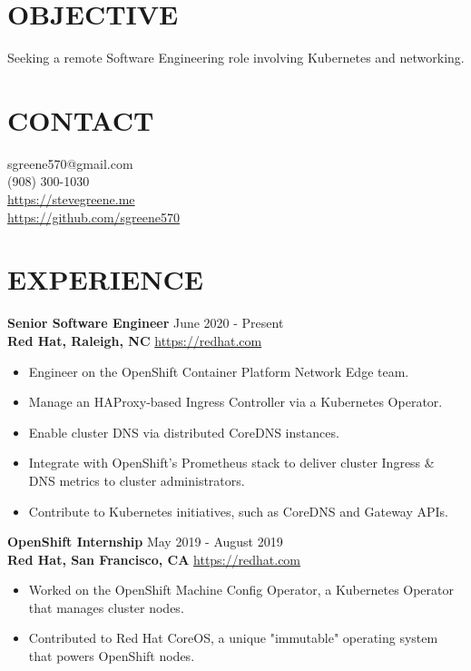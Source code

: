 \documentclass[line, margin, 11pt]{res}
\begin{document}

\begin{resume}

\section{\small OBJECTIVE}
Seeking a remote Software Engineering role involving Kubernetes and networking.

\section{\small CONTACT}
sgreene570@gmail.com \\
(908) 300-1030 \\
\url{https://stevegreene.me} \\
\url{https://github.com/sgreene570}

\section{\small EXPERIENCE}
{\bf \large{Senior Software Engineer}} \hfill June 2020 - Present \\
{\bf Red Hat, Raleigh, NC} \hfill \url{https://redhat.com}
\begin{itemize}
    \item Engineer on the OpenShift Container Platform Network Edge team.
    \item Manage an HAProxy-based Ingress Controller via a Kubernetes Operator.
    \item Enable cluster DNS via distributed CoreDNS instances.
    \item Integrate with OpenShift's Prometheus stack to deliver cluster Ingress \& DNS metrics to cluster administrators.
    \item Contribute to Kubernetes initiatives, such as CoreDNS and Gateway APIs.
\end{itemize}


{\bf \large{OpenShift Internship}} \hfill May 2019 - August 2019 \\
{\bf Red Hat, San Francisco, CA} \hfill \url{https://redhat.com}
\begin{itemize}
    \item Worked on the OpenShift Machine Config Operator, a Kubernetes Operator that manages cluster nodes.
    \item Contributed to Red Hat CoreOS, a unique "immutable" operating system that powers OpenShift nodes.
\end{itemize}



\end{resume}
\end{document}
